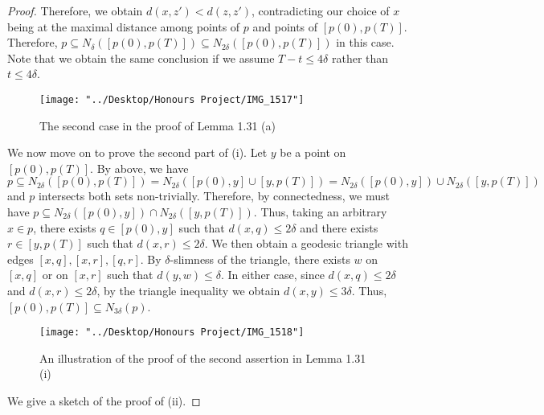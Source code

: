\documentclass[12pt]{article}
\newcommand{\vs}{\vskip10pt}
\begin{document}
\begin{proof}
		Therefore, we obtain $d(x, z') < d(z,z')$, contradicting our choice of $x$ being at the maximal distance among points of $p$ and points of $[p(0), p(T)]$. Therefore, $p \subseteq N_{\delta}([p(0), p(T)]) \subseteq N_{2 \delta}([p(0), p(T)]) $ in this case. Note that we obtain the same conclusion if we assume $T - t \leq 4 \delta$ rather than $t \leq 4 \delta$. 
	
\begin{figure} [H]
	\centering
	\texttt{[image: "../Desktop/Honours Project/IMG\_1517"]}
	\caption{The second case in the proof of Lemma 1.31 (a)}
	\label{fig:img1517}
\end{figure}
		
		\vs 
		
		We now move on to prove the second part of (i). Let $y$ be a point on $[p(0), p(T)]$. By above, we have $p \subseteq N_{2 \delta}([p(0), p(T)]) = N_{2 \delta} ([p(0), y] \cup [y, p(T)]) = N_{2 \delta} ([p(0), y]) \cup N_{2 \delta} ([y, p(T)])$ and $p$ intersects both sets non-trivially. Therefore, by connectedness, we must have $p \subseteq N_{2 \delta} ([p(0), y]) \cap N_{2 \delta} ([y, p(T)])$. Thus, taking an arbitrary $x \in p$, there exists $q \in [p(0), y]$ such that $d(x, q) \leq 2 \delta$ and there exists $r \in [y, p(T)]$ such that $d(x, r) \leq 2 \delta$. We then obtain a geodesic triangle with edges $[x, q], [x, r], [q,r]$. By $\delta$-slimness of the triangle, there exists $w$ on $[x, q]$ or on $[x,r]$ such that $d(y, w) \leq \delta$. In either case, since $d(x, q) \leq 2 \delta$ and $d(x, r) \leq 2 \delta$, by the triangle inequality we obtain $d(x, y) \leq 3 \delta$. Thus, $[p(0), p(T)] \subseteq N_{3 \delta}(p)$. 
		
\begin{figure} [H]
	\centering
	\texttt{[image: "../Desktop/Honours Project/IMG\_1518"]}
	\caption{An illustration of the proof of the second assertion in Lemma 1.31 (i)}
	\label{fig:img1518}
\end{figure}
		
		\vs
		
		We give a sketch of the proof of (ii).
		
		\vs 
		

\end{proof}
\end{document}
